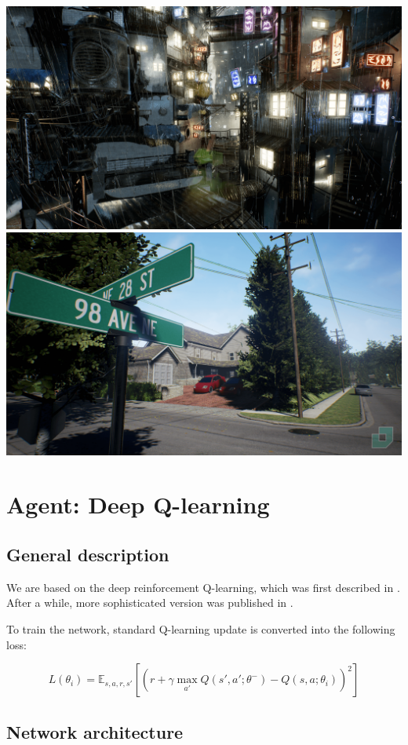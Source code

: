 \documentclass{article}
\begin{document}
\includegraphics[scale=0.1]{environments/city.png}
\includegraphics[scale=0.1]{environments/neighborhood.png}


\section{Agent: Deep Q-learning}

\subsection{General description}

We are based on the deep reinforcement
Q-learning, which was first described in \cite{mnih2013playing}.
After a while, more sophisticated version was published in
\cite{mnih2015humanlevel}.

To train the network, standard Q-learning update is converted into the
following loss:

$$L(\theta_i) = \mathbb{E}_{s,a,r,s'} \left[ \left(r + \gamma \max_{a'}Q(s', a'; \theta^{-}) - Q(s, a; \theta_i) \right)^2 \right] $$

\subsection{Network architecture}
\end{document}
